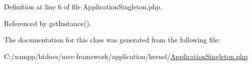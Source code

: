 Definition at line 6 of file Application\+Singleton.\+php.



Referenced by get\+Instance().



The documentation for this class was generated from the following file\+:\begin{DoxyCompactItemize}
\item 
C\+:/xampp/htdocs/mvc-\/framework/application/kernel/\hyperlink{_application_singleton_8php}{Application\+Singleton.\+php}\end{DoxyCompactItemize}

